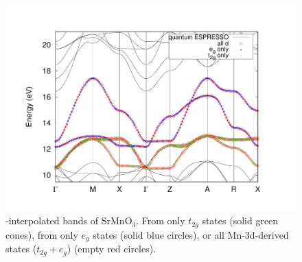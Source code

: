 \begin{figure}[h!]
\centering
\includegraphics[width=0.7\columnwidth]{figure/example20/SrMnO3_allbands.pdf}
\caption{\Wannier{}-interpolated bands of SrMnO$_3$. From only $t_{2g}$ states (solid green cones), from only $e_g$ states (solid blue circles), or all Mn-3d-derived states ($t_{2g} + e_g$) (empty red circles).}
\label{fig20.4}
\end{figure}
